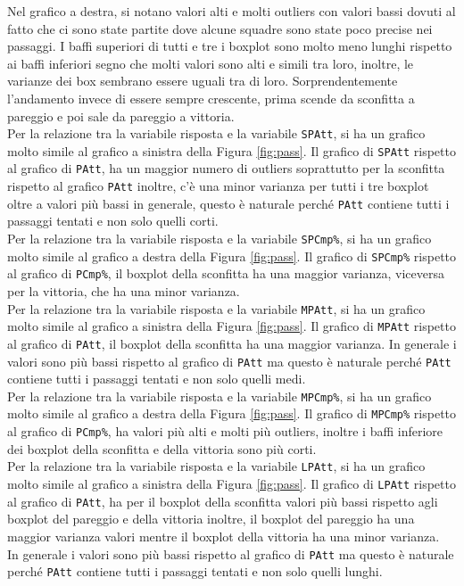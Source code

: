 Nel grafico a destra, si notano valori alti e molti outliers con valori bassi dovuti al fatto che ci sono state partite dove alcune squadre sono state poco precise nei passaggi. I baffi superiori di tutti e tre i boxplot sono molto meno lunghi rispetto ai baffi inferiori segno che molti valori sono alti e simili tra loro, inoltre, le varianze dei box sembrano essere uguali tra di loro. Sorprendentemente l'andamento invece di essere sempre crescente, prima scende da sconfitta a pareggio e poi sale da pareggio a vittoria.\\

Per la relazione tra la variabile risposta e la variabile \texttt{SPAtt}, si ha un grafico molto simile al grafico a sinistra della Figura \ref{fig:pass}. Il grafico di \texttt{SPAtt} rispetto al grafico di \texttt{PAtt}, ha un maggior numero di outliers soprattutto per la sconfitta rispetto al grafico \texttt{PAtt} inoltre, c'è una minor varianza per tutti i tre boxplot oltre a valori più bassi in generale, questo è naturale perché \texttt{PAtt} contiene tutti i passaggi tentati e non solo quelli corti.\\

Per la relazione tra la variabile risposta e la variabile \texttt{SPCmp\%}, si ha un grafico molto simile al grafico a destra della Figura \ref{fig:pass}. Il grafico di \texttt{SPCmp\%} rispetto al grafico di \texttt{PCmp\%}, il boxplot della sconfitta ha una maggior varianza, viceversa per la vittoria, che ha una minor varianza.\\

Per la relazione tra la variabile risposta e la variabile \texttt{MPAtt}, si ha un grafico molto simile al grafico a sinistra della Figura \ref{fig:pass}. Il grafico di \texttt{MPAtt} rispetto al grafico di \texttt{PAtt}, il boxplot della sconfitta ha una maggior varianza. In generale i valori sono più bassi rispetto al grafico di \texttt{PAtt} ma questo è naturale perché \texttt{PAtt} contiene tutti i passaggi tentati e non solo quelli medi.\\

Per la relazione tra la variabile risposta e la variabile \texttt{MPCmp\%}, si ha un grafico molto simile al grafico a destra della Figura \ref{fig:pass}. Il grafico di \texttt{MPCmp\%} rispetto al grafico di \texttt{PCmp\%}, ha valori più alti e molti più outliers, inoltre i baffi inferiore dei boxplot della sconfitta e della vittoria sono più corti.\\

Per la relazione tra la variabile risposta e la variabile \texttt{LPAtt}, si ha un grafico molto simile al grafico a sinistra della Figura \ref{fig:pass}. Il grafico di \texttt{LPAtt} rispetto al grafico di \texttt{PAtt}, ha per il boxplot della sconfitta valori più bassi rispetto agli boxplot del pareggio e della vittoria inoltre, il boxplot del pareggio ha una maggior varianza valori mentre il boxplot della vittoria ha una minor varianza.\\
In generale i valori sono più bassi rispetto al grafico di \texttt{PAtt} ma questo è naturale perché \texttt{PAtt} contiene tutti i passaggi tentati e non solo quelli lunghi.\\

